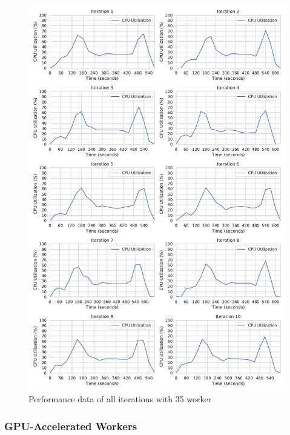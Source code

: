 \begin{figure}[h]
\centering
\includegraphics[scale=0.4]{images/07_evaluation/classification/35_worker_cpu_performance}
\caption{Performance data of all iterations with 35 worker}
\label{fig:appendix_eval_classification_static35}
\end{figure}

\subsubsection{GPU-Accelerated Workers}

